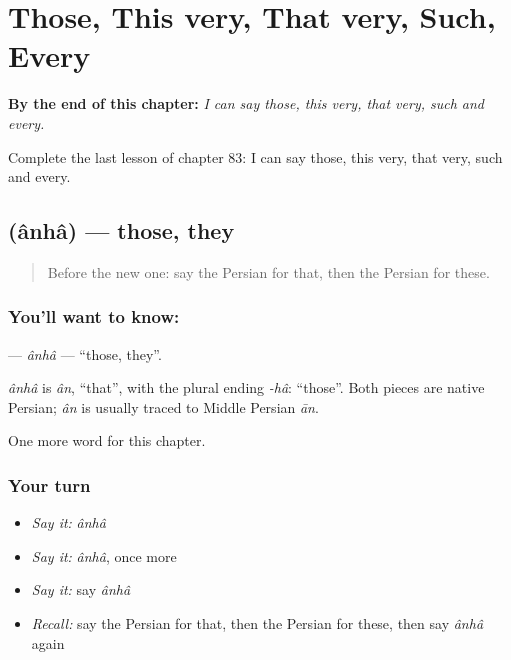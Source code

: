 
\chapter{Those, This very, That very, Such, Every}
\label{ch:fa-those-this-very-that-very-such-every}

\begin{chapteropening}
\textbf{By the end of this chapter:} \emph{I can say those, this very, that very, such and every.}

Complete the last lesson of chapter 83: I can say those, this very, that very, such and every.
\end{chapteropening}

\section[\texorpdfstring{\fa{آنها} (ânhâ)}{آنها (ânhâ)}]{ (ânhâ) — those, they}

\label{lesson:FA-C83-anha}



\begin{quote}
Before the new one: say the Persian for that, then the Persian for these.
\end{quote}

\subsection*{You'll want to know: }
\textbf{} — \emph{ânhâ} — \textquotedblleft{}those, they\textquotedblright{}.

\begin{cousinweb}
\emph{ânhâ} is \emph{ân}, \textquotedblleft{}that\textquotedblright{}, with the plural ending \emph{-hâ}: \textquotedblleft{}those\textquotedblright{}. Both pieces are native Persian; \emph{ân} is usually traced to Middle Persian \emph{ān}.
\end{cousinweb}

\begin{grammarlens}[title={What you've built}]
One more word for this chapter.
\end{grammarlens}

\subsection*{Your turn}
\begin{itemize}
\raggedright
  \item \emph{Say it:} \emph{ânhâ}
  \item \emph{Say it:} \emph{ânhâ}, once more
  \item \emph{Say it:} say \emph{ânhâ}
  \item \emph{Recall:} say the Persian for that, then the Persian for these, then say \emph{ânhâ} again
\end{itemize}

